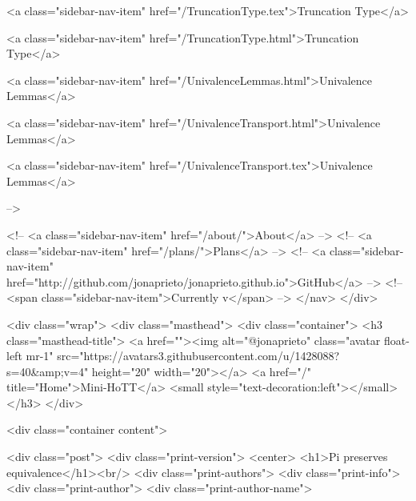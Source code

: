       
    
      
        
          <a class="sidebar-nav-item" href="/TruncationType.tex">Truncation Type</a>
        
      
    
      
        
          <a class="sidebar-nav-item" href="/TruncationType.html">Truncation Type</a>
        
      
    
      
        
          <a class="sidebar-nav-item" href="/UnivalenceLemmas.html">Univalence Lemmas</a>
        
      
    
      
        
          <a class="sidebar-nav-item" href="/UnivalenceTransport.html">Univalence Lemmas</a>
        
      
    
      
        
          <a class="sidebar-nav-item" href="/UnivalenceTransport.tex">Univalence Lemmas</a>
        
      
     -->

    <!-- <a class="sidebar-nav-item" href="/about/">About</a> -->
    <!-- <a class="sidebar-nav-item" href="/plans/">Plans</a> -->
    <!-- <a class="sidebar-nav-item" href="http://github.com/jonaprieto/jonaprieto.github.io">GitHub</a> -->
    <!-- <span class="sidebar-nav-item">Currently v</span> -->
  </nav>
</div>

    <div class="wrap">
      <div class="masthead">
        <div class="container">
          <h3 class="masthead-title">
            <a href=""><img alt="@jonaprieto" class="avatar float-left mr-1" src="https://avatars3.githubusercontent.com/u/1428088?s=40&amp;v=4" height="20" width="20"></a>
            <a href="/" title="Home">Mini-HoTT</a>
            <small style="text-decoration:left"></small>
          </h3>
        </div>
      
      <div class="container content">
        







<div class="post">
  <div class="print-version">
    <center>
      <h1>Pi preserves equivalence</h1><br/>
        <div class="print-authors">
          <div class="print-info">
            <div class="print-author">
              <div class="print-author-name">
                
